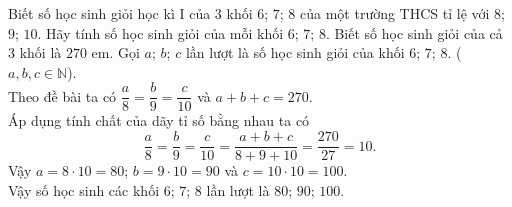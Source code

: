 		\begin{ex}%
		Biết số học sinh giỏi học kì I của $3$ khối $6$; $7$; $8$ của một trường THCS tỉ lệ với $8$; $9$; $10$. Hãy tính số học sinh giỏi của mỗi khối $6$; $7$; $8$. Biết số học sinh giỏi của cả $3$ khối là $270$ em. 
			\loigiai
			{
				Gọi $a$; $b$; $c$ lần lượt là số học sinh giỏi của khối $6$; $7$; $8$. ($a,b,c\in \mathbb{N}$).\\
				Theo đề bài ta có $\dfrac{a}{8}=\dfrac{b}{9}=\dfrac{c}{10}$ và $a+b+c=270$.\\
				Áp dụng tính chất của dãy tỉ số bằng nhau ta có
				\[\dfrac{a}{8}=\dfrac{b}{9}=\dfrac{c}{10}=\dfrac{a+b+c}{8+9+10}=\dfrac{270}{27}=10.\]
				Vậy $a=8\cdot 10= 80$; $b=9\cdot 10=90$ và $c=10\cdot 10=100$.\\ Vậy số học sinh các khối $6$; $7$; $8$ lần lượt là $80$; $90$; $100$. 
			}
		\end{ex}
